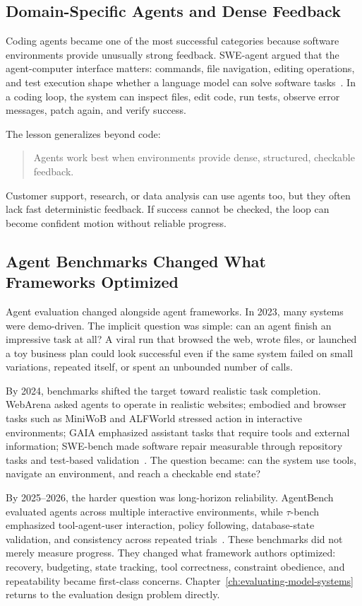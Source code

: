 \subsection{Domain-Specific Agents and Dense Feedback}

Coding agents became one of the most successful categories because software environments provide unusually strong feedback. SWE-agent argued that the agent-computer interface matters: commands, file navigation, editing operations, and test execution shape whether a language model can solve software tasks~\cite{yang2024sweagent}. In a coding loop, the system can inspect files, edit code, run tests, observe error messages, patch again, and verify success.

The lesson generalizes beyond code:

\begin{quote}
Agents work best when environments provide dense, structured, checkable feedback.
\end{quote}

Customer support, research, or data analysis can use agents too, but they often lack fast deterministic feedback. If success cannot be checked, the loop can become confident motion without reliable progress.

\subsection{Agent Benchmarks Changed What Frameworks Optimized}

Agent evaluation changed alongside agent frameworks. In 2023, many systems were demo-driven. The implicit question was simple: can an agent finish an impressive task at all? A viral run that browsed the web, wrote files, or launched a toy business plan could look successful even if the same system failed on small variations, repeated itself, or spent an unbounded number of calls.

By 2024, benchmarks shifted the target toward realistic task completion. WebArena asked agents to operate in realistic websites; embodied and browser tasks such as MiniWoB and ALFWorld stressed action in interactive environments; GAIA emphasized assistant tasks that require tools and external information; SWE-bench made software repair measurable through repository tasks and test-based validation~\cite{zhou2023webarena,jimenez2024swebench}. The question became: can the system use tools, navigate an environment, and reach a checkable end state?

By 2025--2026, the harder question was long-horizon reliability. AgentBench evaluated agents across multiple interactive environments, while \(\tau\)-bench emphasized tool-agent-user interaction, policy following, database-state validation, and consistency across repeated trials~\cite{liu2023agentbench,yao2024taubench}. These benchmarks did not merely measure progress. They changed what framework authors optimized: recovery, budgeting, state tracking, tool correctness, constraint obedience, and repeatability became first-class concerns. Chapter~\ref{ch:evaluating-model-systems} returns to the evaluation design problem directly.

